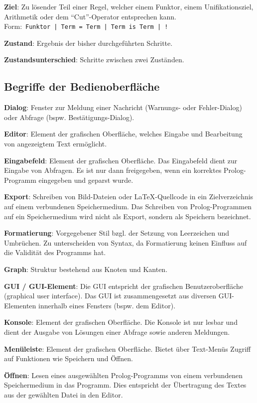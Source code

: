 \documentclass[parskip=full,11pt,twoside]{scrartcl}
\begin{document}
\textbf{Ziel}:
Zu lösender Teil einer Regel, welcher einem Funktor, einem Unifikationsziel, Arithmetik oder dem \enquote{Cut}-Operator entsprechen kann.\\Form:\ \texttt{Funktor | Term = Term | Term is Term | !}

\textbf{Zustand}:
Ergebnis der bisher durchgeführten Schritte.

\textbf{Zustandsunterschied}:
Schritte zwischen zwei Zuständen.

\subsection{Begriffe der Bedienoberfläche}
\textbf{Dialog}:
Fenster zur Meldung einer Nachricht (Warnungs- oder Fehler-Dialog) oder Abfrage (bspw. Bestätigungs-Dialog).

\textbf{Editor}:
Element der grafischen Oberfläche, welches Eingabe und Bearbeitung von angezeigtem Text ermöglicht.

\textbf{Eingabefeld}:
Element der grafischen Oberfläche. Das Eingabefeld dient zur Eingabe von Abfragen. Es ist nur dann freigegeben, wenn ein korrektes Prolog-Programm eingegeben und geparst wurde.

\textbf{Export}:
Schreiben von Bild-Dateien oder LaTeX-Quellcode in ein Zielverzeichnis auf einem verbundenen Speichermedium. Das Schreiben von Prolog-Programmen auf ein Speichermedium wird nicht als Export, sondern als Speichern bezeichnet.

\textbf{Formatierung}:
Vorgegebener Stil bzgl. der Setzung von Leerzeichen und Umbrüchen. Zu unterscheiden von Syntax, da Formatierung keinen Einfluss auf die Validität des Programms hat.

\textbf{Graph}:
Struktur bestehend aus Knoten und Kanten.

\textbf{GUI / GUI-Element}:
Die GUI entspricht der grafischen Benutzeroberfläche (graphical user interface). Das GUI ist zusammengesetzt aus diversen GUI-Elementen innerhalb eines Fensters (bspw. dem Editor).

\textbf{Konsole}:
Element der grafischen Oberfläche. Die Konsole ist nur lesbar und dient der Ausgabe von Lösungen einer Abfrage sowie anderen Meldungen. 

\textbf{Menüleiste}:
Element der grafischen Oberfläche. Bietet über Text-Menüs Zugriff auf Funktionen wie Speichern und Öffnen.

\textbf{Öffnen}:
Lesen eines ausgewählten Prolog-Programms von einem verbundenen Speichermedium in das Programm. Dies entspricht der Übertragung des Textes aus der gewählten Datei in den Editor.
\end{document}
